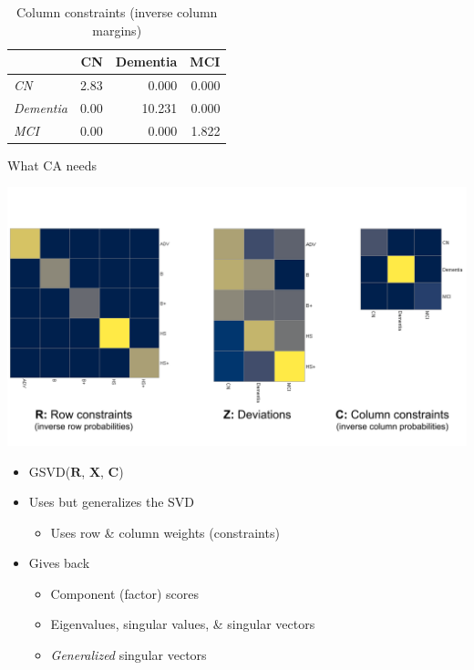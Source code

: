 \documentclass[
  ignorenonframetext,
]{beamer}
\providecommand{\tightlist}{%
  \setlength{\itemsep}{0pt}\setlength{\parskip}{0pt}}
\begin{document}
\begin{frame}

\begin{table}[t]

\caption{\label{tab:edu_dx_chi2_colconstraints}Column constraints (inverse column margins)}
\centering
\begin{tabular}{>{\em}lrrr}
\toprule
  & CN & Dementia & MCI\\
\midrule
CN & 2.83 & 0.000 & 0.000\\
Dementia & 0.00 & 10.231 & 0.000\\
MCI & 0.00 & 0.000 & 1.822\\
\bottomrule
\end{tabular}
\end{table}

\end{frame}

\begin{frame}{What CA needs}
\protect\hypertarget{what-ca-needs}{}

\includegraphics{../images/CA_matrices.png}

\end{frame}

\begin{frame}

\begin{itemize}[<+->]
\tightlist
\item
  GSVD(\(\mathbf{R}\), \(\mathbf{X}\), \(\mathbf{C}\))
\item
  Uses but generalizes the SVD

  \begin{itemize}[<+->]
  \tightlist
  \item
    Uses row \& column weights (constraints)
  \end{itemize}
\item
  Gives back

  \begin{itemize}[<+->]
  \tightlist
  \item
    Component (factor) scores
  \item
    Eigenvalues, singular values, \& singular vectors
  \item
    \emph{Generalized} singular vectors
  \end{itemize}
\end{itemize}

\end{frame}
\end{document}
